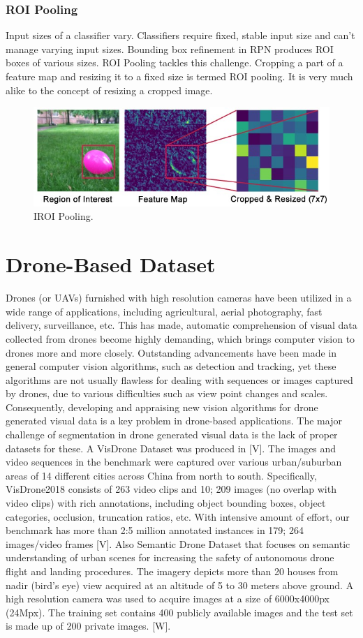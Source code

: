 \subsubsection{ROI Pooling}
Input sizes of a classifier vary. Classifiers require fixed, stable input size and can’t manage varying input sizes. Bounding box refinement in RPN produces ROI boxes of various sizes. ROI Pooling tackles this challenge. Cropping a part of a feature map and resizing it to a fixed size is termed ROI pooling. It is very much alike to the concept of resizing a cropped image.
\begin{figure} 
\centering
  \includegraphics[width=0.5\linewidth]{images/roi.jpg}
   \caption{IROI Pooling.}
\end{figure}

\section{Drone-Based Dataset }
Drones (or UAVs) furnished with high resolution cameras have been utilized in a wide range of applications, including agricultural, aerial photography, fast delivery, surveillance, etc. This has made, automatic comprehension of visual data collected from drones become highly demanding, which brings computer vision to drones more and more closely. Outstanding advancements have been made in general computer vision algorithms, such as detection and tracking, yet these algorithms are not usually flawless for dealing with sequences or images captured by drones, due to various difficulties such as view point changes and scales. Consequently, developing and appraising new vision algorithms for drone generated visual data is a key problem in drone-based applications.
The major challenge of segmentation in drone generated visual data is the lack of proper datasets for these. A VisDrone Dataset was produced in [V]. The images and video sequences in the benchmark were captured over various urban/suburban areas of 14 different cities across China from north to south. Specifically, VisDrone2018 consists of 263 video clips and 10; 209 images (no overlap with video clips) with rich annotations, including object bounding boxes, object categories, occlusion, truncation ratios, etc. With intensive amount of effort, our benchmark has more than 2:5 million annotated instances in 179; 264 images/video frames [V]. Also Semantic Drone Dataset that focuses on semantic understanding of urban scenes for increasing the safety of autonomous drone flight and landing procedures. The imagery depicts more than 20 houses from nadir (bird's eye) view acquired at an altitude of 5 to 30 meters above ground. A high resolution camera was used to acquire images at a size of 6000x4000px (24Mpx). The training set contains 400 publicly available images and the test set is made up of 200 private images. [W].

